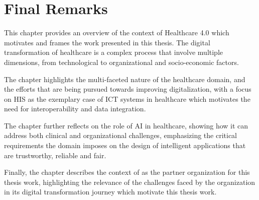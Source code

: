 \section{Final Remarks}

This chapter provides an overview of the context of Healthcare 4.0 which motivates and frames the work presented in this thesis. 
%
The digital transformation of healthcare is a complex process that involve multiple dimensions, from technological to organizational and socio-economic factors.

The chapter highlights the multi-faceted nature of the healthcare domain, and the efforts that are being pursued towards improving digitalization, with a focus on \ac{HIS} as the exemplary case of \ac{ICT} systems in healthcare which motivates the need for interoperability and data integration.

The chapter further reflects on the role of \ac{AI} in healthcare, showing how it can address both clinical and organizational challenges, emphasizing the critical requirements the domain imposes on the design of intelligent applications that are trustworthy, reliable and fair.

Finally, the chapter describes the context of \ausl{} as the partner organization for this thesis work, highlighting the relevance of the challenges faced by the organization in its digital transformation journey which motivate this thesis work. 